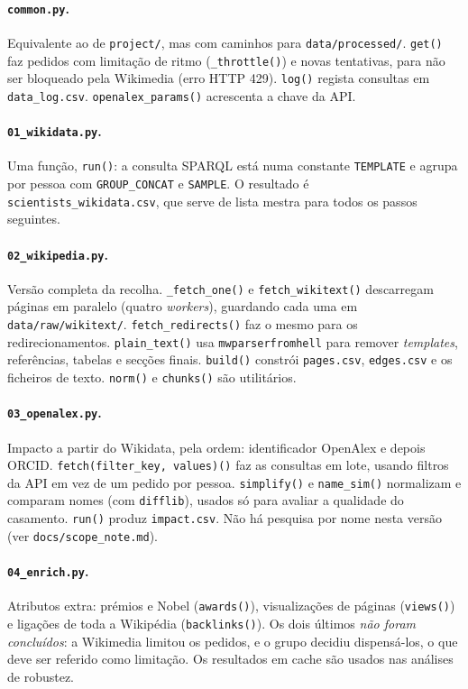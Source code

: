 \documentclass[11pt,a4paper]{article}
\newcommand{\file}[1]{\texttt{#1}}
\newcommand{\fn}[1]{\texttt{#1()}}
\begin{document}
\paragraph{\file{common.py}.} Equivalente ao de \file{project/}, mas com caminhos para \file{data/processed/}. \fn{get} faz pedidos com limitação de ritmo (\fn{_throttle}) e novas tentativas, para não ser bloqueado pela Wikimedia (erro HTTP 429). \fn{log} regista consultas em \file{data_log.csv}. \fn{openalex_params} acrescenta a chave da API.

\paragraph{\file{01_wikidata.py}.} Uma função, \fn{run}: a consulta SPARQL está numa constante \texttt{TEMPLATE} e agrupa por pessoa com \texttt{GROUP\_CONCAT} e \texttt{SAMPLE}. O resultado é \file{scientists_wikidata.csv}, que serve de lista mestra para todos os passos seguintes.

\paragraph{\file{02_wikipedia.py}.} Versão completa da recolha. \fn{_fetch_one} e \fn{fetch_wikitext} descarregam páginas em paralelo (quatro \emph{workers}), guardando cada uma em \file{data/raw/wikitext/}. \fn{fetch_redirects} faz o mesmo para os redirecionamentos. \fn{plain_text} usa \texttt{mwparserfromhell} para remover \emph{templates}, referências, tabelas e secções finais. \fn{build} constrói \file{pages.csv}, \file{edges.csv} e os ficheiros de texto. \fn{norm} e \fn{chunks} são utilitários.

\paragraph{\file{03_openalex.py}.} Impacto a partir do Wikidata, pela ordem: identificador OpenAlex e depois ORCID. \fn{fetch(filter_key, values)} faz as consultas em lote, usando filtros da API em vez de um pedido por pessoa. \fn{simplify} e \fn{name_sim} normalizam e comparam nomes (com \texttt{difflib}), usados só para avaliar a qualidade do casamento. \fn{run} produz \file{impact.csv}. Não há pesquisa por nome nesta versão (ver \file{docs/scope_note.md}).

\paragraph{\file{04_enrich.py}.} Atributos extra: prémios e Nobel (\fn{awards}), visualizações de páginas (\fn{views}) e ligações de toda a Wikipédia (\fn{backlinks}). Os dois últimos \emph{não foram concluídos}: a Wikimedia limitou os pedidos, e o grupo decidiu dispensá-los, o que deve ser referido como limitação. Os resultados em cache são usados nas análises de robustez.
\end{document}
